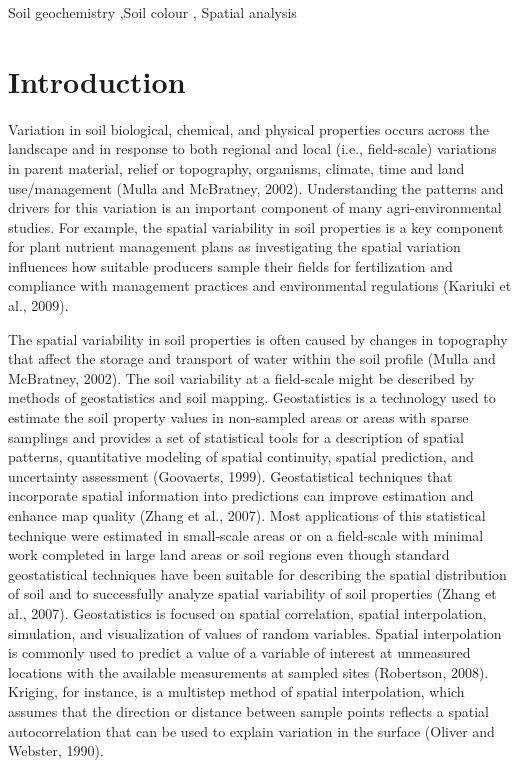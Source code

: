 \documentclass[
  number]{elsarticle}
\begin{document}
\begin{frontmatter}
\begin{keyword}
    Soil geochemistry \sep Soil colour \sep 
    Spatial analysis
\end{keyword}
\end{frontmatter}
    

\section{Introduction}\label{introduction}

Variation in soil biological, chemical, and physical properties occurs
across the landscape and in response to both regional and local (i.e.,
field-scale) variations in parent material, relief or topography,
organisms, climate, time and land use/management (Mulla and McBratney,
2002). Understanding the patterns and drivers for this variation is an
important component of many agri-environmental studies. For example, the
spatial variability in soil properties is a key component for plant
nutrient management plans as investigating the spatial variation
influences how suitable producers sample their fields for fertilization
and compliance with management practices and environmental regulations
(Kariuki et al., 2009).

The spatial variability in soil properties is often caused by changes in
topography that affect the storage and transport of water within the
soil profile (Mulla and McBratney, 2002). The soil variability at a
field-scale might be described by methods of geostatistics and soil
mapping. Geostatistics is a technology used to estimate the soil
property values in non-sampled areas or areas with sparse samplings and
provides a set of statistical tools for a description of spatial
patterns, quantitative modeling of spatial continuity, spatial
prediction, and uncertainty assessment (Goovaerts, 1999). Geostatistical
techniques that incorporate spatial information into predictions can
improve estimation and enhance map quality (Zhang et al., 2007). Most
applications of this statistical technique were estimated in small-scale
areas or on a field-scale with minimal work completed in large land
areas or soil regions even though standard geostatistical techniques
have been suitable for describing the spatial distribution of soil and
to successfully analyze spatial variability of soil properties (Zhang et
al., 2007). Geostatistics is focused on spatial correlation, spatial
interpolation, simulation, and visualization of values of random
variables. Spatial interpolation is commonly used to predict a value of
a variable of interest at unmeasured locations with the available
measurements at sampled sites (Robertson, 2008). Kriging, for instance,
is a multistep method of spatial interpolation, which assumes that the
direction or distance between sample points reflects a spatial
autocorrelation that can be used to explain variation in the surface
(Oliver and Webster, 1990).
\end{document}
